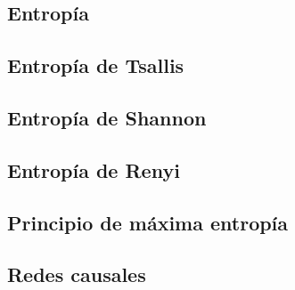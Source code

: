 \subsection{Entropía}

\subsection{Entropía de Tsallis}

\subsection{Entropía de Shannon}

\subsection{Entropía de Renyi} 


\subsection{Principio de máxima entropía}

\subsection{Redes causales}
